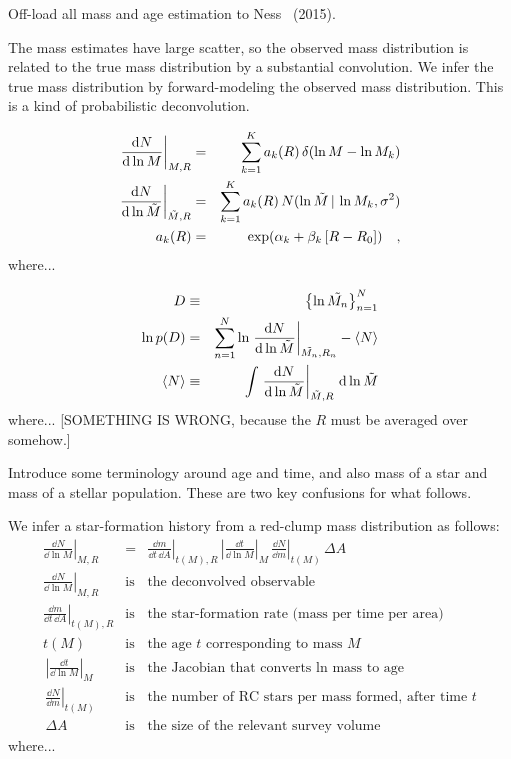 \documentclass[12pt, preprint]{aastex}
\begin{document}
Off-load all mass and age estimation to Ness \etal\ (2015).

The mass estimates have large scatter, so the observed mass
distribution is related to the true mass distribution by a substantial
convolution.
We infer the true mass distribution by forward-modeling the observed
mass distribution.
This is a kind of probabilistic deconvolution.

\begin{eqnarray}
  \left.\frac{\mathrm{d} N}{\mathrm{d}\ln M}\right|_{M,R}
  &=&
  \sum_{k=1}^{K} a_{k}(R)\,\delta(\ln M - \ln M_{k})
  \\
  \left.\frac{\mathrm{d} N}{\mathrm{d}\ln\tilde{M}}\right|_{\tilde{M},R}
  &=&
  \sum_{k=1}^{K} a_{k}(R)\,N(\ln\tilde{M}\,|\, \ln M_{k}, \sigma^2)
  \\
  a_{k}(R)
  &=&
  \exp(\alpha_{k} + \beta_{k}\,[R - R_0])
  \quad ,
\end{eqnarray}
where...

\begin{eqnarray}
  D
  &\equiv&
  \left\{{\ln\tilde{M_n}}\right\}_{n=1}^{N}
  \\
  \ln p(D)
  &=&
  \sum_{n=1}^N \ln\left.\frac{\mathrm{d} N}{\mathrm{d}\ln\tilde{M}}\right|_{\tilde{M_n},R_n}
  - \left<N\right>
  \\
  \left<N\right>
  &\equiv&
  \int \left.\frac{\mathrm{d} N}{\mathrm{d}\ln\tilde{M}}\right|_{\tilde{M},R}\,\mathrm{d}\ln\tilde{M}
\end{eqnarray}
where... [SOMETHING IS WRONG, because the $R$ must be averaged over somehow.]

Introduce some terminology around age and time, and also mass of a
star and mass of a stellar population.
These are two key confusions for what follows.

We infer a star-formation history from a red-clump mass distribution
as follows:
\begin{eqnarray}
  \left.\frac{\dd N}{\dd\ln M}\right|_{M,R}
  &=&
  \left.\frac{\dd m}{\dd t\,\dd A}\right|_{t(M),R}
  \,\left|\frac{\dd t}{\dd\ln M}\right|_{M}
  \,\left.\frac{\dd N}{\dd m}\right|_{t(M)}
  \,\Delta A
  \\
  \left.\frac{\dd N}{\dd\ln M}\right|_{M,R}
  &\mbox{is}&
  \mbox{the deconvolved observable}
  \\
  \left.\frac{\dd m}{\dd t\,\dd A}\right|_{t(M),R}
  &\mbox{is}&
  \mbox{the star-formation rate (mass per time per area)}
  \\
  t(M)
  &\mbox{is}&
  \mbox{the age $t$ corresponding to mass $M$}
  \\
  \,\left|\frac{\dd t}{\dd\ln M}\right|_{M}
  &\mbox{is}&
  \mbox{the Jacobian that converts $\ln$ mass to age}
  \\
  \,\left.\frac{\dd N}{\dd m}\right|_{t(M)}
  &\mbox{is}&
  \mbox{the number of RC stars per mass formed, after time $t$}
  \\
  \,\Delta A
  &\mbox{is}&
  \mbox{the size of the relevant survey volume}
\end{eqnarray}
where...
\end{document}
